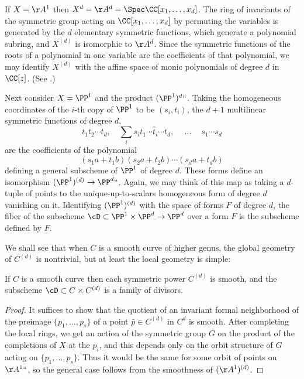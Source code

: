 If $X=\AA^{1}$ then $X^{d} = \AA^{d} = \Spec \CC[x_{1}, \dots,
x_{d}]$. The ring of
invariants of the symmetric group
%
acting on
$\CC[x_{1}, \dots, x_{d}]$ by permuting the variables is generated by the $d$
%
elementary symmetric functions, which generate a polynomial subring, and $X^{(d)}$ is isomorphic to $\AA^{d}$. Since the symmetric functions of the roots of a polynomial in one variable are the coefficients of
that polynomial, we may identify $X^{(d)}$ with the affine space of
monic polynomials of degree $d$ in~$\CC[z]$.
(See \cite[Exercises 1.6, 13.2, 13.3, 13.4]{Eisenbud1995}.)

Next consider $X = \PP^1$ and the product $(\PP^1)^d` `$. Taking the homogeneous coordinates of the
$i$-th copy of $\PP^1$ to be $(s_i,t_i)$, the $d+1$ multilinear symmetric functions of degree $d$,
$$
t_1t_2\cdots t_d,\quad \sum_i s_it_1\cdots\hat t_i\cdots t_d,\ \quad \dots \quad\ s_1\cdots s_d
$$
are the coefficients of the polynomial
$$
(s_1a + t_1b)(s_2a + t_2b)\cdots(s_da + t_db)
$$
defining a general
subscheme
of $\PP^1$ of degree $d$. These forms  define
an isomorphism $(\PP^1)^{(d)} \to \PP^d` `$.
Again, we may think of this map as taking a $d$-tuple of points to the unique-up-to-scalars
homogeneous form of degree $d$ vanishing on it.
Identifying $(\PP^1)^{(d)}$ with the space of forms
$F$ of degree $d$, the fiber of the subscheme $\cD\subset \PP^1 \times \PP^d \to \PP^d$
over a form $F$ is the subscheme defined by $F$.

We shall see that when $C$ is a smooth curve of higher genus, the global geometry of $C^{(d)}$ is nontrivial, but at least the local geometry is simple:

\begin{proposition}
If $C$ is a smooth curve then each symmetric power $C^{(d)}$ is smooth, and the subscheme
$\cD \subset C\times C^{(d)}$ is a family of divisors.
\unif
\end{proposition}

\begin{proof}
It suffices to
 show that the quotient of an invariant
formal neighborhood
of the preimage $\{p_1,\dots, p_s\}$ of a point
 $\bar p\in C^{(d)}$ in $C^d$  is smooth. After completing the local rings, we get an action of the symmetric group
 $G$ on the product of the completions of $X$ at the $p_i$, and this depends only on the orbit
 structure of $G$ acting on $\{p_1,\dots, p_s\}$. Thus it would be the same for some orbit of
 points on $\AA^1` `$, so the general case follows from the smoothness of $(\AA^{1})^{(d)}$.
\unif
 \end{proof}

